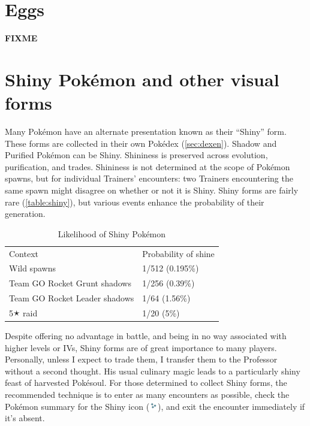 \section{Eggs}
\label{sec:eggs}
\textbf{FIXME}

\section{Shiny Pokémon and other visual forms}
\label{sec:shiny}
Many Pokémon have an alternate presentation known as their ``Shiny'' form.
These forms are collected in their own Pokédex (\autoref{sec:dexen}).
Shadow and Purified Pokémon can be Shiny.
Shininess is preserved across evolution, purification, and trades.
Shininess is not determined at the scope of Pokémon spawns, but for individual
  Trainers' encounters: two Trainers encountering the same spawn might disagree
  on whether or not it is Shiny.
Shiny forms are fairly rare (\autoref{table:shiny}), but various events
  enhance the probability of their generation.
\begin{table}[ht]
\begin{center}
\begin{tabular}{ll}
Context & Probability of shine \\
\Midrule
  Wild spawns & 1/512 (0.195\%) \\
  Team GO Rocket Grunt shadows & 1/256 (0.39\%) \\
  Team GO Rocket Leader shadows & 1/64 (1.56\%) \\
  5🟉 raid & 1/20 (5\%) \\
\end{tabular}
\end{center}
\caption{Likelihood of Shiny Pokémon}
\label{table:shiny}
\end{table}

Despite offering no advantage in battle, and being in no way associated with
  higher levels or IVs, Shiny forms are of great importance to many players.
Personally, unless I expect to trade them, I transfer them to the Professor
  without a second thought.
His usual culinary magic leads to a particularly shiny feast of harvested Pokésoul.
For those determined to collect Shiny forms, the recommended technique
  is to enter as many encounters as possible, check the Pokémon summary
  for the Shiny icon (\includegraphics[width=1em,keepaspectratio]{images/shiny.png}),
  and exit the encounter immediately if it's absent.

